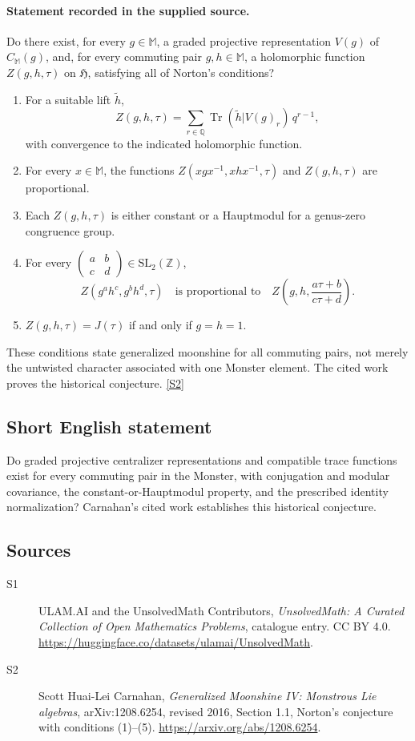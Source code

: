 \documentclass[11pt]{article}
\newcommand{\sref}[2]{\hyperlink{source:#1:#2}{[S#2]}}
\begin{document}
\paragraph{Statement recorded in the supplied source.}
Do there exist, for every \(g\in\mathbb M\), a graded projective
representation \(V(g)\) of \(C_{\mathbb M}(g)\), and, for every commuting
pair \(g,h\in\mathbb M\), a holomorphic function \(Z(g,h,\tau)\) on
\(\mathfrak H\), satisfying all of Norton's conditions?
\begin{enumerate}
\item For a suitable lift \(\widetilde h\),
\[
 Z(g,h,\tau)=\sum_{r\in\mathbb Q}
       \operatorname{Tr}(\widetilde h|V(g)_r)\,q^{r-1},
\]
with convergence to the indicated holomorphic function.
\item For every \(x\in\mathbb M\), the functions
\(Z(xgx^{-1},xhx^{-1},\tau)\) and \(Z(g,h,\tau)\) are proportional.
\item Each \(Z(g,h,\tau)\) is either constant or a Hauptmodul for a
genus-zero congruence group.
\item For every
\(\begin{pmatrix}a&b\\c&d\end{pmatrix}\in\mathrm{SL}_2(\mathbb Z)\),
\[
 Z(g^ah^c,g^bh^d,\tau)
   \quad\text{is proportional to}\quad
 Z\!\left(g,h,\frac{a\tau+b}{c\tau+d}\right).
\]
\item \(Z(g,h,\tau)=J(\tau)\) if and only if \(g=h=1\).
\end{enumerate}
These conditions state generalized moonshine for all commuting pairs,
not merely the untwisted character associated with one Monster element.
The cited work proves the historical conjecture. \sref{statement}{2}
\subsection{Short English statement}
Do graded projective centralizer representations and compatible trace functions exist for every commuting pair in the Monster, with conjugation and modular covariance, the constant-or-Hauptmodul property, and the prescribed identity normalization? Carnahan's cited work establishes this historical conjecture.
\subsection{Sources}
\begin{description}
\item[\hypertarget{source:statement:1}{S1}] ULAM.AI and the UnsolvedMath Contributors, \emph{UnsolvedMath: A Curated Collection of Open Mathematics Problems}, catalogue entry. CC BY 4.0. \url{https://huggingface.co/datasets/ulamai/UnsolvedMath}.
\item[\hypertarget{source:statement:2}{S2}] Scott Huai-Lei Carnahan, \emph{Generalized Moonshine IV: Monstrous Lie algebras}, arXiv:1208.6254, revised 2016, Section 1.1, Norton's conjecture with conditions (1)--(5). \url{https://arxiv.org/abs/1208.6254}.
\end{description}
\label{end:statement}
\end{document}
